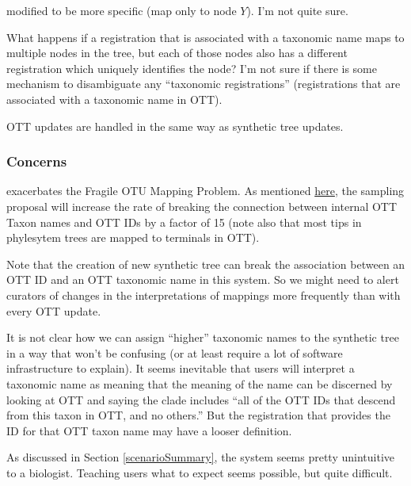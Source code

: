 \documentclass[11pt]{article}
\newcommand{\mthcomment}[1]{{\color{red} #1}\xspace}
\newcommand{\fragileOTUMapping}{Fragile OTU Mapping Problem\xspace}
\begin{document}
\begin{compactenum}
\begin{compactenum}
\begin{compactenum}
        modified to be more specific (map only to node $Y$). \mthcomment{I'm not quite sure.}
      \end{compactenum}
      \item What happens if a registration that is associated with a taxonomic name maps to
      multiple nodes in the tree, but each of those nodes also has a different registration
      which uniquely identifies the node? I'm not sure if there is some mechanism to 
      disambiguate any ``taxonomic registrations'' (registrations that are associated with
      a taxonomic name in OTT).
    \end{compactenum}
  \item OTT updates are handled in the same way as synthetic tree updates.
\end{compactenum}
\subsubsection{Concerns}
\begin{compactenum}
  \item exacerbates the \fragileOTUMapping.
  As mentioned \href{https://docs.google.com/document/d/1hJHjMckLywnoBuY1xG3I0hP-rsl4l8du3iA8kflEOQE/edit?pli=1#heading=h.aqib3hn3t8nx}{here},
  the sampling proposal will increase the rate of breaking the connection
  between internal OTT Taxon names and OTT IDs by a factor of 15 (note also that
  most tips in phylesytem trees are mapped to terminals in OTT).
  \item Note that the creation of new synthetic tree can break the association
  between an OTT ID and an OTT taxonomic name in this system.
  So we might need to alert curators of changes in the interpretations of 
  mappings more frequently than with every OTT update.
  \item It is not clear how we can assign ``higher'' taxonomic names to the 
  synthetic tree in a way that won't be confusing (or at least require a lot
  of software infrastructure to explain).
  It seems inevitable that users will interpret a taxonomic name as meaning
  that the meaning of the name can be discerned by looking at OTT and saying
  the clade includes ``all of the OTT IDs that descend from this taxon in OTT, 
  and no others.''
  But the registration that provides the ID for that OTT taxon name may have a
    looser definition.
  \item As discussed in Section \ref{scenarioSummary}, the system seems pretty
  unintuitive to a biologist.
  Teaching users what to expect seems possible, but quite difficult.
\end{compactenum}
\end{document}
